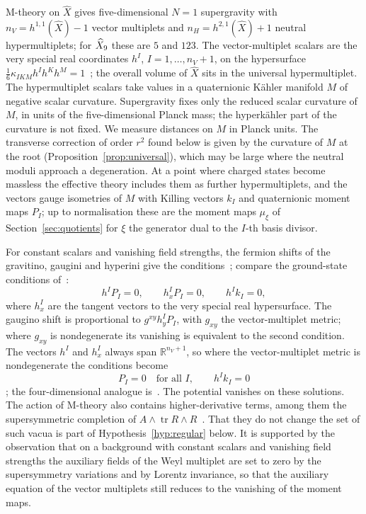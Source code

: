 M-theory on $\widehat X$ gives five-dimensional $N=1$ supergravity with
$n_V=h^{1,1}(\widehat X)-1$ vector multiplets and $n_H=h^{2,1}(\widehat X)+1$ neutral
hypermultiplets; for $\widehat X_9$ these are $5$ and $123$. The vector-multiplet scalars are the
very special real coordinates $h^I$, $I=1,\dots,n_V+1$, on the hypersurface
$\frac16\kappa_{IKM}h^Ih^Kh^M=1$~\cite{Gunaydin:1984}; the overall volume of $\widehat X$ sits
in the universal hypermultiplet. The hypermultiplet scalars take values in a quaternionic
K\"ahler manifold $M$ of negative scalar curvature. Supergravity fixes only the reduced scalar
curvature of $M$, in units of the five-dimensional Planck mass; the hyperk\"ahler part of the
curvature is not fixed. We measure distances on $M$ in Planck units. The transverse
correction of order $r^2$ found below is given by the curvature of $M$ at the root
(Proposition~\ref{prop:universal}), which may be large where the neutral moduli approach a degeneration.
At a point where charged states become massless the effective theory includes them as further
hypermultiplets, and the vectors gauge isometries of $M$ with Killing vectors $k_I$ and
quaternionic moment maps $P_I$; up to normalisation these are the moment maps $\mu_\xi$ of
Section~\ref{sec:quotients} for $\xi$ the generator dual to the $I$-th basis divisor.

For constant scalars and vanishing field strengths, the fermion shifts of the gravitino,
gaugini and hyperini give the conditions~\cite[eq.~(2.9)]{W26quantum}; compare the ground-state
conditions of~\cite[eqs.~(5.17)--(5.18)]{Ceresole:2000}:
\begin{equation}
 h^IP_I=0,\qquad h^I_xP_I=0,\qquad h^Ik_I=0 ,
 \label{eq:shifts}
\end{equation}
where $h^I_x$ are the tangent vectors to the very special real hypersurface. The gaugino shift
is proportional to $g^{xy}h^I_yP_I$, with $g_{xy}$ the vector-multiplet metric; where $g_{xy}$ is
nondegenerate its vanishing is equivalent to the second condition. The vectors $h^I$ and $h^I_x$
always span $\mathbb R^{n_V+1}$, so where the vector-multiplet metric is nondegenerate the
conditions become
\begin{equation}
 P_I=0\quad\text{for all }I,\qquad h^Ik_I=0
 \label{eq:vacua}
\end{equation}
\cite[eq.~(2.10)]{W26quantum}; the four-dimensional analogue is~\cite[Sect.~2.4.2]{Hristov:2009}.
The potential vanishes on these solutions. The action of M-theory also contains
higher-derivative terms, among them the supersymmetric completion of
$A\wedge\operatorname{tr}R\wedge R$~\cite{Hanaki:2006}. That they do not change the set of such
vacua is part of Hypothesis~\ref{hyp:regular} below. It is supported by the observation that on
a background with constant scalars and vanishing field strengths the auxiliary fields of the
Weyl multiplet are set to zero by the supersymmetry variations and by Lorentz invariance, so
that the auxiliary equation of the vector multiplets still reduces to the vanishing of the
moment maps.


